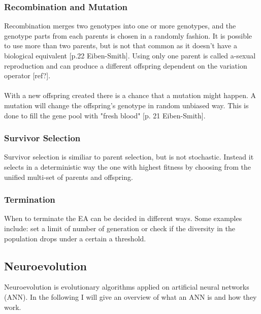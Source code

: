 \documentclass[11pt, a4paper]{article}
\begin{document}
\subsubsection{Recombination and Mutation}
Recombination merges two genotypes into one or more genotypes, and the genotype parts from each parents is chosen in a randomly fashion. It is possible to use more than two parents, but is not that common as it doesn't have a biological equivalent [p.22 Eiben-Smith]. Using only one parent is called a-sexual reproduction and can produce a different offspring dependent on the variation operator [ref?].
\\
\\
With a new offspring created there is a chance that a mutation might happen. A mutation will change the offspring's genotype in random unbiased way. This is done to fill the gene pool with "fresh blood" [p. 21 Eiben-Smith].
\subsubsection{Survivor Selection}
Survivor selection is similiar to parent selection, but is not stochastic. Instead it selects in a deterministic way the one with highest fitness by choosing from the unified multi-set of parents and offspring.
\subsubsection{Termination}
When to terminate the EA can be decided in different ways. Some examples include: set a limit of number of generation or check if the diversity in the population drops under a certain a threshold.
\subsection{Neuroevolution}
Neuroevolution is evolutionary algorithms applied on artificial neural networks (ANN). In the following I will give an overview of what an ANN is and how they work.
\end{document}
